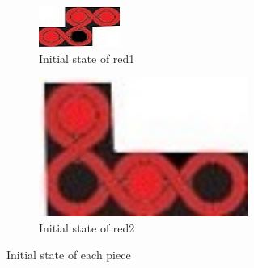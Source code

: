 \begin{figure}[htbp]
\begin{subfigure}[b]{.24\textwidth}
\centering
\includegraphics[width =\textwidth]{figs/red1.jpg}
\caption{Initial state of red1}
  \label{fig:2Dred1}
\end{subfigure}
\begin{subfigure}[b]{.24\textwidth}
\centering
\includegraphics[width=0.75\textwidth]{figs/red2.jpg}
\caption{Initial state of red2}
  \label{fig:2Dred2}
\end{subfigure}
\caption{Initial state of each piece}
  \label{fig:allinit}
\end{figure}
